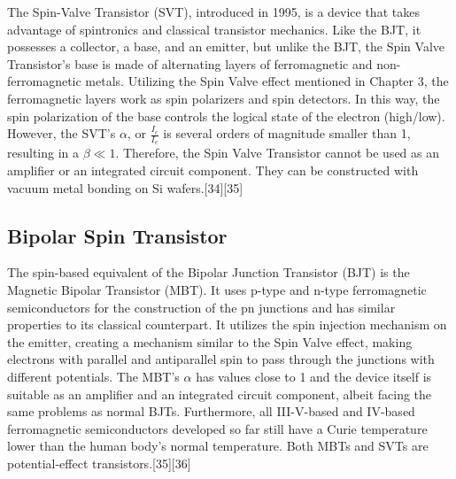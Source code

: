 \documentclass{article}
\begin{document}
The Spin-Valve Transistor (SVT), introduced in 1995, is a device that takes advantage of spintronics and classical transistor mechanics. Like the BJT, it possesses a collector, a base, and an emitter, but unlike the BJT, the Spin Valve Transistor’s base is made of alternating layers of ferromagnetic and non-ferromagnetic metals. Utilizing the Spin Valve effect mentioned in Chapter 3, the ferromagnetic layers work as spin polarizers and spin detectors. In this way, the spin polarization of the base controls the logical state of the electron (high/low). However, the SVT’s $\alpha$, or $\frac{I_{c}}{I_{e}}$ is several orders of magnitude smaller than 1, resulting in a $\beta \ll 1$. Therefore, the Spin Valve Transistor cannot be used as an amplifier or an integrated circuit component. They can be constructed with vacuum metal bonding on Si wafers.[34][35]

\subsection{Bipolar Spin Transistor}
The spin-based equivalent of the Bipolar Junction Transistor (BJT) is the Magnetic Bipolar Transistor (MBT). It uses p-type and n-type ferromagnetic semiconductors for the construction of the pn junctions and has similar properties to its classical counterpart. It utilizes the spin injection mechanism on the emitter, creating a mechanism similar to the Spin Valve effect, making electrons with parallel and antiparallel spin to pass through the junctions with different potentials. The MBT’s $\alpha$ has values close to 1 and the device itself is suitable as an amplifier and an integrated circuit component, albeit facing the same problems as normal BJTs. Furthermore, all III-V-based and IV-based ferromagnetic semiconductors developed so far still have a Curie temperature lower than the human body’s normal temperature. Both MBTs and SVTs are potential-effect transistors.[35][36]
\end{document}

